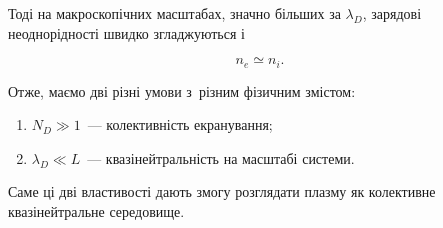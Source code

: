 Тоді на макроскопічних масштабах, значно більших за $\lambda_D$, зарядові неоднорідності
швидко згладжуються і

\begin{equation*}
    n_e\simeq n_i.
\end{equation*}

Отже, маємо дві різні умови з~різним фізичним змістом:
\begin{enumerate}
	\item \( N_D\gg1 \)~--- колективність екранування;
	\item \(\lambda_D\ll L\)~--- квазінейтральність на масштабі системи.
\end{enumerate}

Саме ці дві властивості дають змогу розглядати плазму як колективне квазінейтральне
середовище.






